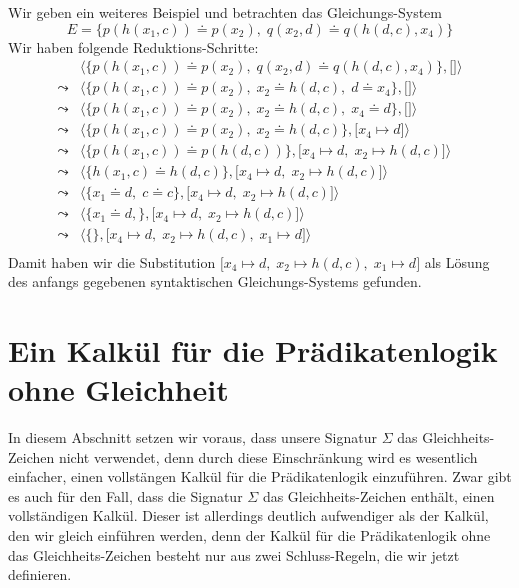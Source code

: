 \example
Wir geben ein weiteres Beispiel und betrachten das Gleichungs-System 
\[ E = \big\{ p(h(x_1,c)) \doteq p(x_2),\; q(x_2, d) \doteq q(h(d,c),x_4) \big\} \]
Wir haben folgende Reduktions-Schritte:
$$
\begin{array}{ll}
          & \big\langle \big\{ p(h(x_1,c)) \doteq p(x_2),\; q(x_2, d) \doteq q(h(d,c),x_4) \big\}, \big[ \big] \big\rangle \\[0.2cm]
 \leadsto & \big\langle \big\{ p(h(x_1,c)) \doteq p(x_2),\; x_2 \doteq h(d,c), \; d \doteq x_4 \big\}, \big[ \big] \big\rangle \\[0.2cm]
 \leadsto & \big\langle \big\{ p(h(x_1,c)) \doteq p(x_2),\; x_2 \doteq h(d,c), \; x_4 \doteq d \big\}, \big[ \big] \big\rangle \\[0.2cm]
 \leadsto & \big\langle \big\{ p(h(x_1,c)) \doteq p(x_2),\; x_2 \doteq h(d,c) \big\}, \big[ x_4 \mapsto d \big] \big\rangle \\[0.2cm]
 \leadsto & \big\langle \big\{ p(h(x_1,c)) \doteq p(h(d,c)) \big\}, \big[ x_4 \mapsto d,\; x_2 \mapsto h(d,c) \big] \big\rangle \\[0.2cm]
 \leadsto & \big\langle \big\{ h(x_1,c) \doteq h(d,c) \big\}, \big[ x_4 \mapsto d,\; x_2 \mapsto h(d,c) \big] \big\rangle \\[0.2cm]
 \leadsto & \big\langle \big\{ x_1 \doteq d,\; c \doteq c \big\}, \big[ x_4 \mapsto d,\; x_2 \mapsto h(d,c) \big] \big\rangle \\[0.2cm]
 \leadsto & \big\langle \big\{ x_1 \doteq d,\big\}, \big[ x_4 \mapsto d,\; x_2 \mapsto h(d,c) \big] \big\rangle \\[0.2cm]
 \leadsto & \big\langle \big\{\big\}, \big[ x_4 \mapsto d,\; x_2 \mapsto h(d,c),\; x_1 \mapsto d \big] \big\rangle \\[0.2cm]
\end{array}
$$
Damit haben wir die Substitution  $\big[ x_4 \mapsto d,\; x_2 \mapsto h(d,c),\; x_1 \mapsto d \big]$ als L\"{o}sung 
des anfangs gegebenen syntaktischen Gleichungs-Systems gefunden.  
\eox




\section{Ein Kalk\"{u}l f\"{u}r die Pr\"{a}dikatenlogik ohne Gleichheit}
In diesem Abschnitt setzen wir voraus, dass unsere Signatur $\Sigma$ das Gleichheits-Zeichen nicht
verwendet, denn durch diese Einschr\"{a}nkung wird es wesentlich einfacher, einen vollst\"{a}ngen Kalk\"{u}l f\"{u}r
die Pr\"{a}dikatenlogik einzuf\"{u}hren.  Zwar gibt es auch f\"{u}r den Fall, dass die Signatur $\Sigma$ das
Gleichheits-Zeichen enth\"{a}lt, einen vollst\"{a}ndigen Kalk\"{u}l.  Dieser ist allerdings deutlich
aufwendiger als der Kalk\"{u}l, den wir gleich einf\"{u}hren werden,  denn der Kalk\"{u}l f\"{u}r die Pr\"{a}dikatenlogik ohne
das Gleichheits-Zeichen besteht nur aus zwei Schluss-Regeln, die wir jetzt definieren.
\pagebreak

